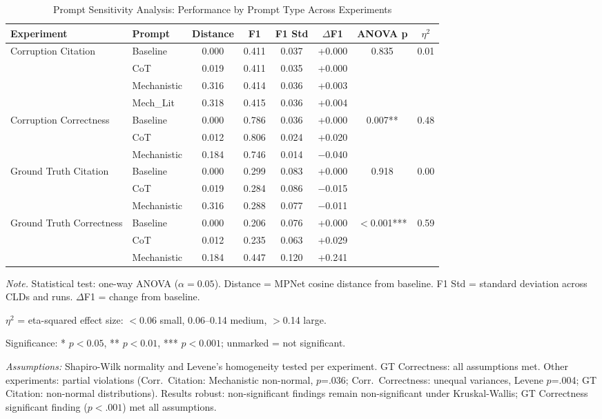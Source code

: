 \documentclass{article}
\begin{document}
\begin{table}[H]
\centering
\caption{Prompt Sensitivity Analysis: Performance by Prompt Type Across Experiments}
\label{tab:prompt_sensitivity}
\begin{threeparttable}
\begin{tabular}{llcccccc}
\toprule
\textbf{Experiment} & \textbf{Prompt} & \textbf{Distance} & \textbf{F1} & \textbf{F1 Std} & \textbf{$\Delta$F1} & \textbf{ANOVA p} & \textbf{$\eta^2$} \\
\midrule
Corruption Citation & Baseline & 0.000 & 0.411 & 0.037 & +0.000 & 0.835 & 0.01 \\
 & CoT & 0.019 & 0.411 & 0.035 & +0.000 &  & \\
 & Mechanistic & 0.316 & 0.414 & 0.036 & +0.003 &  & \\
 & Mech\_Lit & 0.318 & 0.415 & 0.036 & +0.004 &  & \\
\midrule
Corruption Correctness & Baseline & 0.000 & 0.786 & 0.036 & +0.000 & 0.007** & 0.48 \\
 & CoT & 0.012 & 0.806 & 0.024 & +0.020 &  & \\
 & Mechanistic & 0.184 & 0.746 & 0.014 & $-$0.040 &  & \\
\midrule
Ground Truth Citation & Baseline & 0.000 & 0.299 & 0.083 & +0.000 & 0.918 & 0.00 \\
 & CoT & 0.019 & 0.284 & 0.086 & $-$0.015 &  & \\
 & Mechanistic & 0.316 & 0.288 & 0.077 & $-$0.011 &  & \\
\midrule
Ground Truth Correctness & Baseline & 0.000 & 0.206 & 0.076 & +0.000 & $<$0.001*** & 0.59 \\
 & CoT & 0.012 & 0.235 & 0.063 & +0.029 &  & \\
 & Mechanistic & 0.184 & 0.447 & 0.120 & +0.241 &  & \\
\bottomrule
\end{tabular}
\begin{tablenotes}
\small
\item \textit{Note.} Statistical test: one-way ANOVA ($\alpha=0.05$). Distance = MPNet cosine distance from baseline. F1 Std = standard deviation across CLDs and runs. $\Delta$F1 = change from baseline.
\item $\eta^2$ = eta-squared effect size: $<$0.06 small, 0.06--0.14 medium, $>$0.14 large.
\item Significance: * $p<0.05$, ** $p<0.01$, *** $p<0.001$; unmarked = not significant.
\item \textit{Assumptions:} Shapiro-Wilk normality and Levene's homogeneity tested per experiment. GT Correctness: all assumptions met. Other experiments: partial violations (Corr.\ Citation: Mechanistic non-normal, $p$=.036; Corr.\ Correctness: unequal variances, Levene $p$=.004; GT Citation: non-normal distributions). Results robust: non-significant findings remain non-significant under Kruskal-Wallis; GT Correctness significant finding ($p<.001$) met all assumptions.

\end{tablenotes}
\end{threeparttable}
\end{table}
\end{document}
